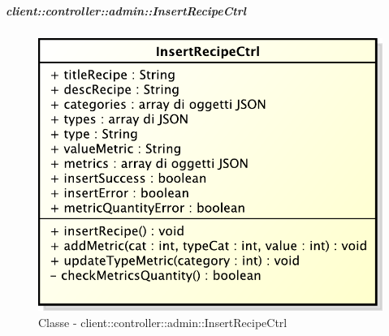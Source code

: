 		\subparagraph{client::controller::admin::InsertRecipeCtrl} %
		\label{subp:bdsm_app_client_controller_admin_insertctrl}
			\begin{figure}[htbp]
				\centering
				\centerline{\includegraphics[scale=0.7]{./images/client/classes/controller/insert_recipe_ctrl.pdf}}
				\caption{Classe - client::controller::admin::InsertRecipeCtrl}
			\end{figure}
